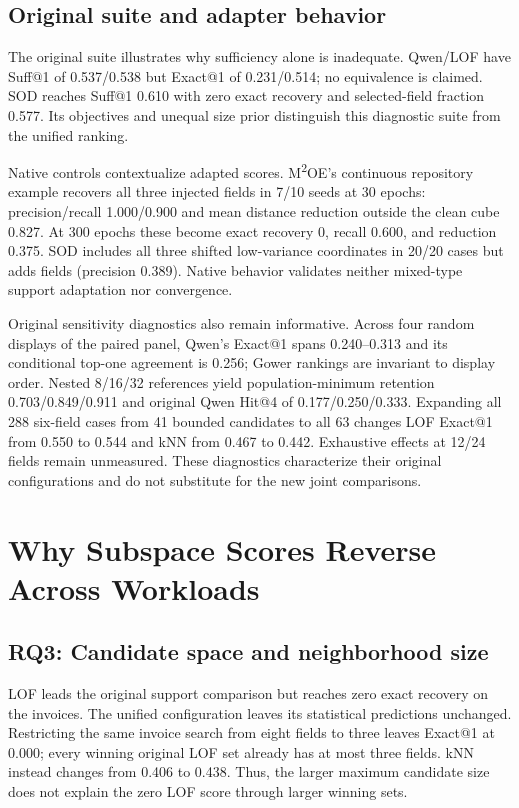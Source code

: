 \documentclass[conference]{IEEEtran}
\begin{document}
\subsection{Original suite and adapter behavior}

The original suite illustrates why sufficiency alone is inadequate. Qwen/LOF have Suff@1 of 0.537/0.538 but Exact@1 of 0.231/0.514; no equivalence is claimed. SOD reaches Suff@1 0.610 with zero exact recovery and selected-field fraction 0.577. Its objectives and unequal size prior distinguish this diagnostic suite from the unified ranking.

Native controls contextualize adapted scores. M\textsuperscript{2}OE's continuous repository example recovers all three injected fields in 7/10 seeds at 30 epochs: precision/recall 1.000/0.900 and mean distance reduction outside the clean cube 0.827. At 300 epochs these become exact recovery 0, recall 0.600, and reduction 0.375. SOD includes all three shifted low-variance coordinates in 20/20 cases but adds fields (precision 0.389). Native behavior validates neither mixed-type support adaptation nor convergence.

Original sensitivity diagnostics also remain informative. Across four random displays of the paired panel, Qwen's Exact@1 spans 0.240--0.313 and its conditional top-one agreement is 0.256; Gower rankings are invariant to display order. Nested 8/16/32 references yield population-minimum retention 0.703/0.849/0.911 and original Qwen Hit@4 of 0.177/0.250/0.333. Expanding all 288 six-field cases from 41 bounded candidates to all 63 changes LOF Exact@1 from 0.550 to 0.544 and kNN from 0.467 to 0.442. Exhaustive effects at 12/24 fields remain unmeasured. These diagnostics characterize their original configurations and do not substitute for the new joint comparisons.

\section{Why Subspace Scores Reverse Across Workloads}
\subsection{RQ3: Candidate space and neighborhood size}
LOF leads the original support comparison but reaches zero exact recovery on the invoices. The unified configuration leaves its statistical predictions unchanged. Restricting the same invoice search from eight fields to three leaves Exact@1 at 0.000; every winning original LOF set already has at most three fields. kNN instead changes from 0.406 to 0.438. Thus, the larger maximum candidate size does not explain the zero LOF score through larger winning sets.
\end{document}

